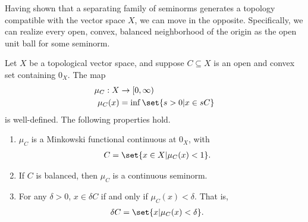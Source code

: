 \documentclass[10pt]{mypackage}
\begin{document}
Having shown that a separating family of seminorms generates a topology compatible with the vector space $X$, we can move in the opposite. Specifically, we can realize every open, convex, balanced neighborhood of the origin as the open unit ball for some seminorm.
\begin{lemma}
  Let $X$ be a topological vector space, and suppose $C\subseteq X$ is an open and convex set containing $0_X$. The map
  \begin{align*}
    \mu_{C}: X&\rightarrow [0,\infty)\\
    \mu_{C}(x) &= \inf\set{s > 0 | x\in sC}
  \end{align*}
  is well-defined. The following properties hold.
  \begin{enumerate}[(1)]
    \item $\mu_{C}$ is a Minkowski functional continuous at $0_X$, with
      \begin{align*}
        C &= \set{x\in X | \mu_{C}(x) < 1}.
      \end{align*}
   \item If $C$ is balanced, then $\mu_{C}$ is a continuous seminorm.
   \item For any $\delta > 0$, $x\in \delta C$ if and only if $\mu_{C}(x) < \delta$. That is,
     \begin{align*}
       \delta C &= \set{x | \mu_{C}(x) < \delta}.
     \end{align*}
  \end{enumerate}
\end{lemma}
\end{document}
